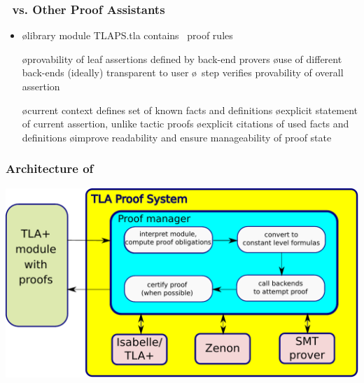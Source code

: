 \documentclass[fleqn]{beamer}
\begin{document}
\begin{frame}
  \frametitle{\tlaps\ vs. Other Proof Assistants}

  \begin{itemize}
  \item {}

    \begin{itemize}
    \o library module TLAPS.tla contains \tlaplus\ proof rules
    \end{itemize}

  \oo {}

    \begin{itemize}
    \o provability of leaf assertions defined by back-end provers
    \o use of different back-ends (ideally) transparent to user
    \o \QED\ step verifies provability of overall assertion
    \end{itemize}

  \oo {}

    \begin{itemize}
    \o current context defines set of known facts and definitions
    \o explicit statement of current assertion, unlike tactic proofs
    \o explicit citations of used facts and definitions
    \o improve readability and ensure manageability of proof state
    \end{itemize}
  \end{itemize}
\end{frame}

\begin{frame}
  \frametitle{Architecture of \tlaps}

  \centerline{\includegraphics[width=1.0\linewidth]{figs/architecture}}
\end{frame}
\end{document}
